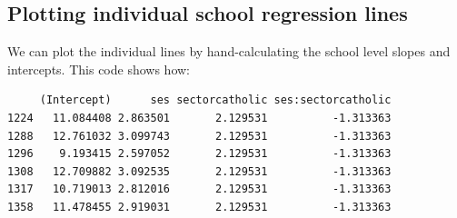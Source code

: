 \documentclass[
  letterpaper,
  DIV=11,
  numbers=noendperiod]{scrreprt}
\newenvironment{Shaded}{\begin{snugshade}}{\end{snugshade}}
\newcommand{\AttributeTok}[1]{\textcolor[rgb]{0.49,0.56,0.16}{#1}}
\newcommand{\FloatTok}[1]{\textcolor[rgb]{0.25,0.63,0.44}{#1}}
\newcommand{\FunctionTok}[1]{\textcolor[rgb]{0.02,0.16,0.49}{#1}}
\newcommand{\NormalTok}[1]{\textcolor[rgb]{0.00,0.44,0.13}{#1}}
\newcommand{\OtherTok}[1]{\textcolor[rgb]{0.00,0.44,0.13}{#1}}
\newcommand{\SpecialCharTok}[1]{\textcolor[rgb]{0.25,0.44,0.63}{#1}}
\newcommand{\StringTok}[1]{\textcolor[rgb]{0.25,0.44,0.63}{#1}}
\begin{document}
\hypertarget{plotting-individual-school-regression-lines}{%
\subsection{Plotting individual school regression
lines}\label{plotting-individual-school-regression-lines}}

We can plot the individual lines by hand-calculating the school level
slopes and intercepts. This code shows how:

\begin{Shaded}
\end{Shaded}

\begin{verbatim}
     (Intercept)      ses sectorcatholic ses:sectorcatholic
1224   11.084408 2.863501       2.129531          -1.313363
1288   12.761032 3.099743       2.129531          -1.313363
1296    9.193415 2.597052       2.129531          -1.313363
1308   12.709882 3.092535       2.129531          -1.313363
1317   10.719013 2.812016       2.129531          -1.313363
1358   11.478455 2.919031       2.129531          -1.313363
\end{verbatim}

\begin{Shaded}
\end{Shaded}
\end{document}
